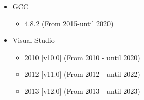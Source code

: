 \begin{itemize}
\item GCC
  \begin{itemize}
      \item 4.8.2 (From 2015-until 2020)  %
   \end{itemize}
\item Visual Studio %
  \begin{itemize}
  \item 2010 [v10.0] (From 2010 - until 2020) %
  \item 2012 [v11.0] (From 2012 - until 2022) %
  \item 2013 [v12.0] (From 2013 - until 2023) %
  \end{itemize}


\end{itemize}
